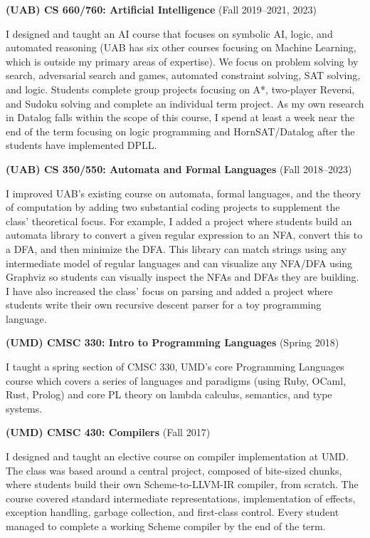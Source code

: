 \documentclass[line]{res}
\begin{document}
\begin{resume}
\textbf{(UAB) CS 660/760: Artificial Intelligence} (Fall 2019--2021, 2023)

I designed and taught an AI course that focuses on symbolic AI, logic, and automated reasoning (UAB has six other courses focusing on Machine Learning, which is outside my primary areas of expertise). We focus on problem solving by search, adversarial search and games, automated constraint solving, SAT solving, and logic. Students complete group projects focusing on A*, two-player Reversi, and Sudoku solving and complete an individual term project. As my own research in Datalog falls within the scope of this course, I spend at least a week near the end of the term focusing on logic programming and HornSAT/Datalog after the students have implemented DPLL.

\textbf{(UAB) CS 350/550: Automata and Formal Languages} (Fall 2018--2023)

I improved UAB's existing course on automata, formal languages, and the theory of computation by adding two substantial coding projects to supplement the class' theoretical focus. For example, I added a project where students build an automata library to convert a given regular expression to an NFA, convert this to a DFA, and then minimize the DFA. This library can match strings using any intermediate model of regular languages and can visualize any NFA/DFA using Graphviz so students can visually inspect the NFAs and DFAs they are building. I have also increased the class' focus on parsing and added a project where students write their own recursive descent parser for a toy programming language.

\textbf{(UMD) CMSC 330: Intro to Programming Languages} (Spring 2018)

I taught a spring section of CMSC 330, UMD's core Programming Languages course which covers a series of languages and paradigms (using Ruby, OCaml, Rust, Prolog) and core PL theory on lambda calculus, semantics, and type systems. 

\textbf{(UMD) CMSC 430: Compilers} (Fall 2017)

I designed and taught an elective course on compiler implementation at UMD. The class was based around a central project, composed of bite-sized chunks, where students build their own Scheme-to-LLVM-IR compiler, from scratch. The course covered standard intermediate representations, implementation of effects, exception handling, garbage collection, and first-class control. Every student managed to complete a working Scheme compiler by the end of the term.



\end{resume}
\end{document}
